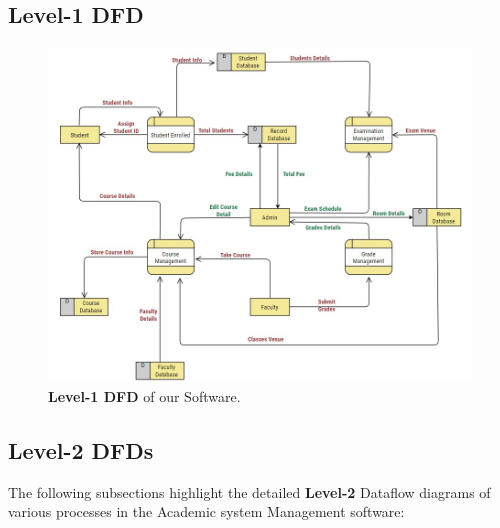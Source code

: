 \documentclass[12pt,a4paper]{article}
\begin{document}
\subsection{Level-1 DFD}
\begin{figure}[H]
    \centering
        \includegraphics[scale=0.7]{Level_1_DFD.jpg} 
    \caption{\textbf{Level-1 DFD} of our Software.}
\end{figure}


\subsection{Level-2 DFDs}
The following subsections highlight the detailed \textbf{Level-2} Dataflow diagrams of various processes in the Academic system Management software:
\end{document}
